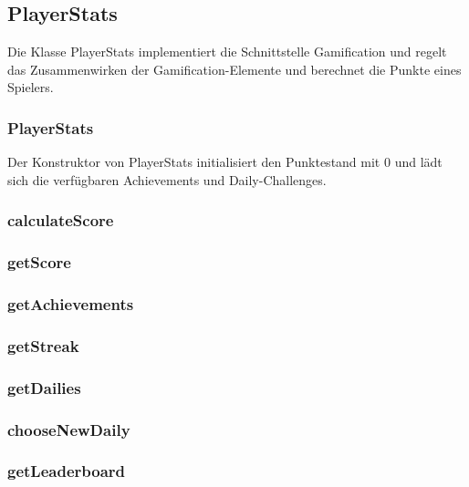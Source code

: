 \documentclass[a4paper]{scrreprt}
\begin{document}
   
   \subsection{PlayerStats}
   Die Klasse PlayerStats implementiert die Schnittstelle Gamification und regelt das Zusammenwirken der Gamification-Elemente und berechnet die Punkte eines Spielers.
   \subsubsection{PlayerStats}
   Der Konstruktor von PlayerStats initialisiert den Punktestand mit 0 und lädt sich die verfügbaren Achievements und Daily-Challenges.
   \subsubsection{calculateScore}
   \subsubsection{getScore}
   \subsubsection{getAchievements}
   \subsubsection{getStreak}
   \subsubsection{getDailies}
   \subsubsection{chooseNewDaily}
   \subsubsection{getLeaderboard}
   
   
\end{document}
